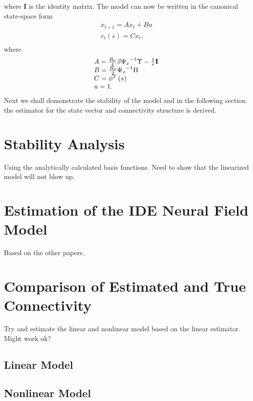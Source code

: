 \documentclass[journal]{IEEEtran}
\begin{document}
where \textbf{I} is the identity matrix. The model can now be written in the canonical state-space form
\begin{equation}\label{27}
\begin{array}{c}
 {x_{t + 1}} = A{x_t} + Bu \\
 {v_t}\left( s \right) = C{x_t}, \\
 \end{array}
\end{equation}
where
\begin{equation}\label{28}
\begin{array}{l}
 A = \frac{{{R_0}}}{4}\beta {\Psi _x}^{ - 1}\Upsilon  - \frac{1}{\tau }{\bf{I}} \\
 B = \frac{{{R_0}}}{2}{\Psi _x}^{ - 1}\Pi  \\
 C = {\phi ^T}\left( s \right) \\
 u = 1. \\
 \end{array}
\end{equation}
Next we shall demonstrate the stability of the model and in the following section the estimator for the state vector and connectivity structure is derived.

\section{Stability Analysis}
Using the analytically calculated basis functions. Need to show that the linearized model will not blow up.

\section{Estimation of the IDE Neural Field Model}
Based on the other papers.

\section{Comparison of Estimated and True Connectivity}
Try and estimate the linear and nonlinear model based on the linear estimator. Might work ok?

\subsection{Linear Model}

\subsection{Nonlinear Model}
\end{document}
